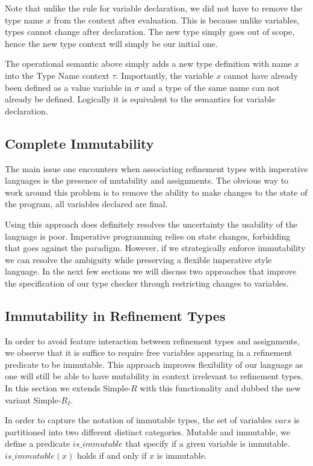 \documentclass[a4paper,12pt]{report}
\begin{document}
\par
Note that unlike the rule for variable declaration, we did not have to remove 
the type name $x$ from the context after evaluation. This is because unlike 
variables, types cannot change after declaration. The new type simply goes 
out of scope, hence the new type context will simply be our initial one. 

\par
The operational semantic above simply adds a new type definition with name $x$ 
into the Type Name context $\tau$. Importantly, the variable $x$ cannot have 
already been defined as a value variable in $\sigma$ and a type of the same name 
can not already be defined. Logically it is equivalent to the semantics for 
variable declaration.

\subsection{Complete Immutability}
The main issue one encounters when associating refinement types with imperative 
languages is the presence of mutability and assignments. The obvious way to 
work around this problem is to remove the ability to make changes to the state 
of the program, all variables declared are final.

\par
Using this approach does definitely resolves the uncertainty the usability of 
the language is poor. Imperative programming relies on state changes, forbidding 
that goes against the paradigm. However, if we strategically enforce immutability 
we can resolve the ambiguity while preserving a flexible imperative style 
language. In the next few sections we will discuss two approaches that 
improve the specification of our type checker through restricting changes to 
variables. 

\subsection{Immutability in Refinement Types}
In order to avoid feature interaction between refinement types and assignments, we 
observe that it is suffice to require free variables appearing in a refinement 
predicate to be immutable. This approach improves flexibility of our language as 
one will still be able to have mutability in context irrelevant to refinement 
types. In this section we extends Simple-$R$ with this functionality and dubbed 
the new variant Simple-$R_{I}$.

\par
In order to capture the notation of immutable types, the set of variables $vars$ 
is partitioned into two different distinct categories. Mutable and immutable, we 
define a predicate $is\_immutable$ that specify if a given variable is immutable. 
$is\_immutable(x)$ holds if and only if $x$ is immutable. 
\end{document}
